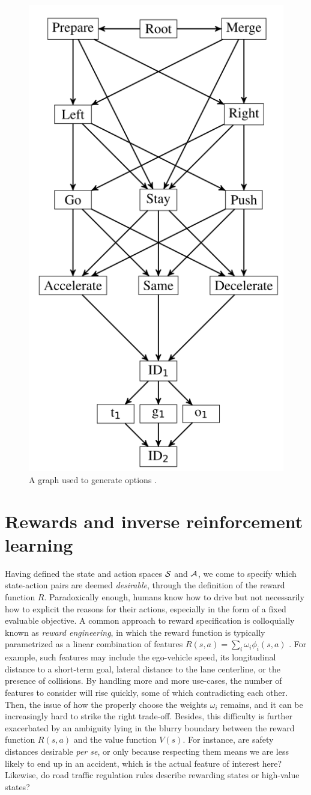 \begin{figure}[th]
	\centering
	\includegraphics[width=0.3\linewidth]{img/options}
	\caption{A graph used to generate options \citep{ShalevShwartz2016}.}
	\label{fig:options-graph}
\end{figure}

\section{Rewards and inverse reinforcement learning}
\label{sec:irl}

Having defined the state and action spaces $\mathcal{S}$ and $\mathcal{A}$, we come to specify which state-action pairs are deemed \emph{desirable}, through the definition of the reward function $R$. Paradoxically enough, humans know how to drive but not necessarily how to explicit the reasons for their actions, especially in the form of a fixed evaluable objective. A common approach to reward specification is colloquially known as \emph{reward engineering}, in which the reward function is typically parametrized as a linear combination of features $R(s,a) = \sum_i \omega_i \phi_i(s,a)$ . For example, such features may include the ego-vehicle speed, its longitudinal distance to a short-term goal, lateral distance to the lane centerline, or the presence of collisions.
By handling more and more use-cases, the number of features to consider will rise quickly, some of which contradicting each other. Then, the issue of how the properly choose the weights $\omega_i$ remains, and it can be increasingly hard to strike the right trade-off.
Besides, this difficulty is further exacerbated by an ambiguity lying in the blurry boundary between the reward function $R(s,a)$ and the value function $V(s)$. For instance, are safety distances desirable \textit{per se}, or only because respecting them means we are less likely to end up in an accident, which is the actual feature of interest here? Likewise, do road traffic regulation rules describe rewarding states or high-value states?

